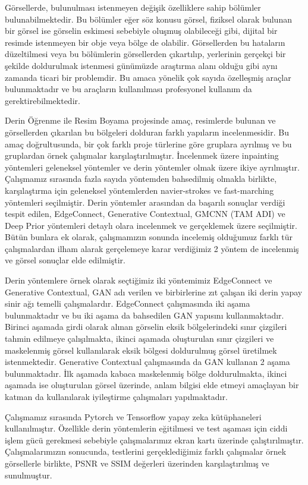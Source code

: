 Görsellerde, bulunulması istenmeyen değişik özelliklere sahip bölümler bulunabilmektedir. Bu bölümler eğer söz konusu görsel, fiziksel olarak bulunan bir görsel ise görselin eskimesi sebebiyle oluşmuş olabileceği gibi, dijital bir resimde istenmeyen bir obje veya bölge de olabilir. Görsellerden bu hataların düzeltilmesi veya bu bölümlerin görsellerden çıkartılıp, yerlerinin gerçekçi bir şekilde doldurulmak istenmesi günümüzde araştırma alanı olduğu gibi aynı zamanda ticari bir problemdir. Bu amaca yönelik çok sayıda özelleşmiş araçlar bulunmaktadır ve bu araçların kullanılması profesyonel kullanım da gerektirebilmektedir.

Derin Öğrenme ile Resim Boyama projesinde amaç, resimlerde bulunan ve görsellerden çıkarılan bu bölgeleri dolduran farklı yapıların incelenmesidir. Bu amaç doğrultusunda, bir çok farklı proje türlerine göre gruplara ayrılmış ve bu gruplardan örnek çalışmalar karşılaştırılmıştır. İncelenmek üzere inpainting yöntemleri geleneksel yöntemler ve derin yöntemler olmak üzere ikiye ayrılmıştır. Çalışmamız sırasında fazla sayıda yöntemden bahsedilmiş olmakla birlikte, karşılaştırma için geleneksel yöntemlerden navier-strokes ve fast-marching yöntemleri seçilmiştir. Derin yöntemler arasından da başarılı sonuçlar verdiği tespit edilen, EdgeConnect, Generative Contextual, GMCNN (TAM ADI) ve Deep Prior yöntemleri detaylı olara incelenmek ve gerçeklemek üzere seçilmiştir. Bütün bunlara ek olarak, çalışmamızın sonunda incelemiş olduğumuz farklı tür çalışmalardan ilham alarak gerçelemeye karar verdiğimiz 2 yöntem de incelenmiş ve görsel sonuçlar elde edilmiştir.

Derin yöntemlere örnek olarak seçtiğimiz iki yöntemimiz EdgeConnect ve Generative Contextual, GAN adı verilen ve birbirlerine zıt çalışan iki derin yapay sinir ağı temelli çalışmalardır. EdgeConnect çalışmasında iki aşama bulunmaktadır ve bu iki aşama da bahsedilen GAN yapısını kullanmaktadır. Birinci aşamada girdi olarak alınan görselin eksik bölgelerindeki sınır çizgileri tahmin edilmeye çalışılmakta, ikinci aşamada oluşturulan sınır çizgileri ve maskelenmiş görsel kullanılarak eksik bölgesi doldurulmuş görsel üretilmek istenmektedir. Generative Contextual çalışmasında da GAN kullanan 2 aşama bulunmaktadır. İlk aşamada kabaca maskelenmiş bölge doldurulmakta, ikinci aşamada ise oluşturulan görsel üzerinde, anlam bilgisi elde etmeyi amaçlayan bir katman da kullanılarak iyileştirme çalışmaları yapılmaktadır.


Çalışmamız sırasında Pytorch ve Tensorflow yapay zeka kütüphaneleri kullanılmıştır. Özellikle derin yöntemlerin eğitilmesi ve test aşaması için ciddi işlem gücü gerekmesi sebebiyle çalışmalarımız ekran kartı üzerinde çalıştırılmıştır. Çalışmalarımızın sonucunda, testlerini gerçeklediğimiz farklı çalışmalar örnek görsellerle birlikte, PSNR ve SSIM değerleri üzerinden karşılaştırılmış ve sunulmuştur.